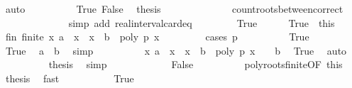 \begin{isabellebody}
\ auto\isanewline
\ \ \ \ \ \ \ \ \isamarkupfalse%
\ True\ False\ \isamarkupfalse%
\ {\isacharquery}thesis\isanewline
\ \ \ \ \ \ \ \ \ \ \ \ \isamarkupfalse%
\ count{\isacharunderscore}roots{\isacharunderscore}between{\isacharunderscore}correct\ \isanewline
\ \ \ \ \ \ \ \ \ \ \ \ \isamarkupfalse%
\ {\isacharparenleft}simp\ add{\isacharcolon}\ real{\isacharunderscore}interval{\isacharunderscore}card{\isacharunderscore}eq{\isacharparenright}\isanewline
\ \ \ \ \isamarkupfalse%
\isanewline
{}\isamarkupfalse%
\isanewline
\ \ \isamarkupfalse%
\ True\isanewline
\ \ \ \ \isamarkupfalse%
\ True{\isacharprime}\ {\isacharequal}\ this\isanewline
\ \ \ \ \isamarkupfalse%
\ fin{\isacharcolon}\ {\isachardoublequoteopen}finite\ {\isacharbraceleft}x{\isachardot}\ a\ {\isasymle}\ x\ {\isasymand}\ x\ {\isasymle}\ b\ {\isasymand}\ poly\ p\ x\ {\isacharequal}\ {}{\isacharbraceright}{\isachardoublequoteclose}\ \isanewline
\ \ \ \ \isamarkupfalse%
\ {\isacharparenleft}cases\ {\isachardoublequoteopen}p\ {\isacharequal}\ {}{\isachardoublequoteclose}{\isacharparenright}\isanewline
\ \ \ \ \ \ \isamarkupfalse%
\ True\isanewline
\ \ \ \ \ \ \ \ \isamarkupfalse%
\ True{\isacharprime}\ \isamarkupfalse%
\ {\isachardoublequoteopen}a\ {\isacharequal}\ b{\isachardoublequoteclose}\ \isamarkupfalse%
\ simp\isanewline
\ \ \ \ \ \ \ \ \isamarkupfalse%
\ {\isachardoublequoteopen}{\isacharbraceleft}x{\isachardot}\ a\ {\isasymle}\ x\ {\isasymand}\ x\ {\isasymle}\ b\ {\isasymand}\ poly\ p\ x\ {\isacharequal}\ {}{\isacharbraceright}\ {\isacharequal}\ {\isacharbraceleft}b{\isacharbraceright}{\isachardoublequoteclose}\ \isamarkupfalse%
\ True\ \isamarkupfalse%
\ auto\isanewline
\ \ \ \ \ \ \ \ \isamarkupfalse%
\ {\isacharquery}thesis\ \isamarkupfalse%
\ simp\isanewline
\ \ \ \ \isamarkupfalse%
\isanewline
\ \ \ \ \ \ \isamarkupfalse%
\ False\isanewline
\ \ \ \ \ \ \ \ \isamarkupfalse%
\ poly{\isacharunderscore}roots{\isacharunderscore}finite{\isacharbrackleft}OF\ this{\isacharbrackright}\ \isamarkupfalse%
\ {\isacharquery}thesis\ \isamarkupfalse%
\ fast\isanewline
\ \ \ \ \isamarkupfalse%
\isanewline
\ \ \ \ \isamarkupfalse%
\ True\ \isamarkupfalse%

\end{isabellebody}
